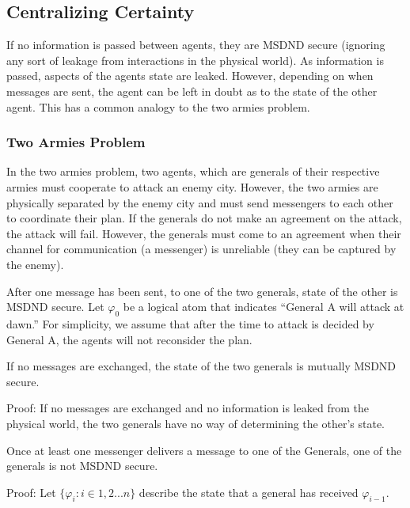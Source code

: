 \subsection{Centralizing Certainty}

If no information is passed between agents, they are MSDND secure (ignoring any sort of leakage from interactions in the physical world). As information is passed, aspects of the agents state are leaked. However, depending on when messages are sent, the agent can be left in doubt as to the state of the other agent. This has a common analogy to the two armies problem. 

\subsubsection{Two Armies Problem}

In the two armies problem, two agents, which are generals of their respective armies must cooperate to attack an enemy city. However, the two armies are physically separated by the enemy city and must send messengers to each other to coordinate their plan. If the generals do not make an agreement on the attack, the attack will fail. However, the generals must come to an agreement when their channel for communication (a messenger) is unreliable (they can be captured by the enemy).

After one message has been sent, to one of the two generals, state of the other is MSDND secure. Let $\varphi_0$ be a logical atom that indicates ``General A will attack at dawn.'' For simplicity, we assume that after the time to attack is decided by General A, the agents will not reconsider the plan.

\begin{thm}
If no messages are exchanged, the state of the two generals is mutually MSDND secure. \label{thm:nomsg}
\end{thm}

Proof: If no messages are exchanged and no information is leaked from the physical world, the two generals have no way of determining the other's state.

\begin{thm}
Once at least one messenger delivers a message to one of the Generals, one of the generals is not MSDND secure.
\end{thm}

Proof:
Let $\{ \varphi_i : i \in 1,2 ... n \}$ describe the state that a general has received $\varphi_{i-1}$.

